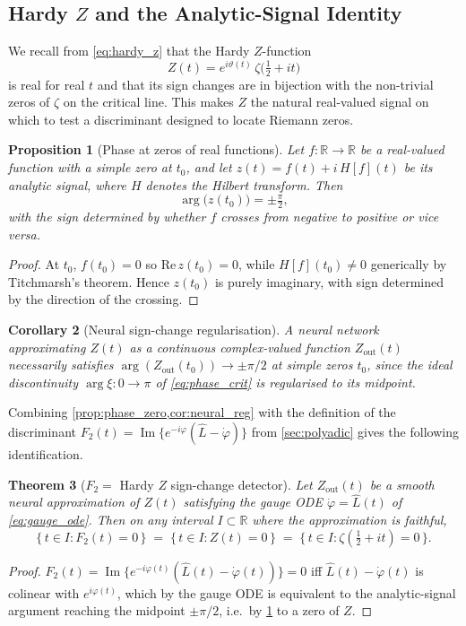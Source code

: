 \documentclass[11pt, a4paper]{article}
\theoremstyle{definition}
\theoremstyle{plain}
\newtheorem{theorem}{Theorem}[section]
\newtheorem{proposition}[theorem]{Proposition}
\newtheorem{corollary}[theorem]{Corollary}
\newcommand{\xif}{\xi}                      %
\begin{document}
\subsection{Hardy $Z$ and the Analytic-Signal Identity}
\label{sec:hardy_analytic}

We recall from \cref{eq:hardy_z} that the Hardy $Z$-function
\begin{equation}
  Z(t) = e^{i\vartheta(t)}\,\zeta\bigl(\tfrac{1}{2}+it\bigr)
\end{equation}
is real for real $t$ and that its sign changes are in bijection with
the non-trivial zeros of $\zeta$ on the critical line. This makes
$Z$ the natural real-valued signal on which to test a discriminant
designed to locate Riemann zeros.

\begin{proposition}[Phase at zeros of real functions]
\label{prop:phase_zero}
Let $f : \mathbb{R} \to \mathbb{R}$ be a real-valued function with a
simple zero at $t_0$, and let $z(t) = f(t) + i\,H[f](t)$ be its
analytic signal, where $H$ denotes the Hilbert transform. Then
\[
  \arg\bigl(z(t_0)\bigr) = \pm\tfrac{\pi}{2},
\]
with the sign determined by whether $f$ crosses from negative to
positive or vice versa.
\end{proposition}
\begin{proof}
At $t_0$, $f(t_0)=0$ so $\mathrm{Re}\,z(t_0)=0$, while
$H[f](t_0)\neq 0$ generically by Titchmarsh's theorem. Hence
$z(t_0)$ is purely imaginary, with sign determined by the direction
of the crossing.
\end{proof}

\begin{corollary}[Neural sign-change regularisation]
\label{cor:neural_reg}
A neural network approximating $Z(t)$ as a continuous complex-valued
function $Z_{\mathrm{out}}(t)$ necessarily satisfies
$\arg(Z_{\mathrm{out}}(t_0)) \to \pm\pi/2$ at simple zeros $t_0$,
since the ideal discontinuity $\arg\xif : 0 \to \pi$ of
\cref{eq:phase_crit} is regularised to its midpoint.
\end{corollary}

Combining \cref{prop:phase_zero,cor:neural_reg} with the definition
of the discriminant
$F_2(t) = \operatorname{Im}\{e^{-i\varphi}(\hat L - \dot\varphi)\}$
from \cref{sec:polyadic} gives the following identification.

\begin{theorem}[$F_2 = $ Hardy $Z$ sign-change detector]
\label{thm:f2_hardy}
Let $Z_{\mathrm{out}}(t)$ be a smooth neural approximation of
$Z(t)$ satisfying the gauge ODE $\dot\varphi = \hat L(t)$ of
\cref{eq:gauge_ode}. Then on any interval
$I\subset\mathbb{R}$ where the approximation is faithful,
\[
  \{\,t\in I : F_2(t)=0\,\}
  \;=\;
  \{\,t\in I : Z(t)=0\,\}
  \;=\;
  \{\,t\in I : \zeta(\tfrac{1}{2}+it)=0\,\}.
\]
\end{theorem}
\begin{proof}
$F_2(t)=\operatorname{Im}\{e^{-i\varphi(t)}(\hat L(t)-\dot\varphi(t))\}=0$
iff $\hat L(t)-\dot\varphi(t)$ is colinear with $e^{i\varphi(t)}$, which
by the gauge ODE is equivalent to the analytic-signal argument
reaching the midpoint $\pm\pi/2$, i.e.\ by
\cref{prop:phase_zero} to a zero of $Z$.
\end{proof}
\end{document}
